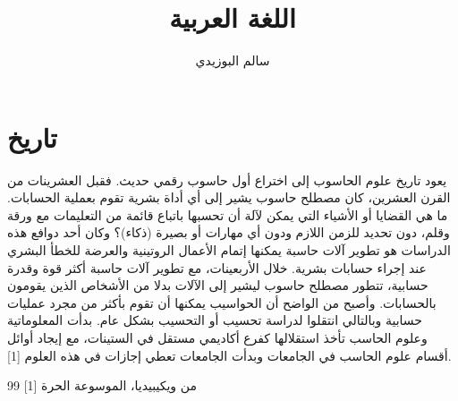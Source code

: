 \documentclass[11pt,a4paper]{article}
\title{
    \Huge\textsc{اللغة العربية}
}
\author{سالم البوزيدي}
\begin{document}
\maketitle
\newpage
\tableofcontents
\newpage

\section{تاريخ}

 
\begin{otherlanguage}{arabic}
يعود تاريخ علوم الحاسوب إلى اختراع أول حاسوب رقمي حديث. فقبل العشرينات من القرن العشرين، كان مصطلح حاسوب  يشير إلى أي أداة بشرية تقوم بعملية الحسابات. ما هي القضايا أو الأشياء التي يمكن لآلة أن تحسبها باتباع قائمة من التعليمات مع ورقة وقلم، دون تحديد للزمن اللازم ودون أي مهارات أو بصيرة (ذكاء)؟ وكان أحد دوافع هذه الدراسات هو تطوير آلات حاسبة  يمكنها إتمام الأعمال الروتينية والعرضة للخطأ البشري عند إجراء حسابات بشرية.
خلال الأربعينات، مع تطوير آلات حاسبة أكثر قوة وقدرة حسابية، تتطور مصطلح حاسوب ليشير إلى الآلات بدلا من الأشخاص الذين يقومون بالحسابات. وأصبح من الواضح أن الحواسيب يمكنها أن تقوم بأكثر من مجرد عمليات حسابية وبالتالي انتقلوا لدراسة تحسيب أو التحسيب بشكل عام. بدأت المعلوماتية وعلوم الحاسب تأخذ استقلالها كفرع أكاديمي مستقل في الستينات، مع إيجاد أوائل أقسام علوم الحاسب في الجامعات وبدأت الجامعات تعطي إجازات في هذه العلوم [1]. 
\end{otherlanguage}
\begin{thebibliography}{99}
   [1]
       من ويكيبيديا، الموسوعة الحرة
       \end{thebibliography}
       
\end{document}
